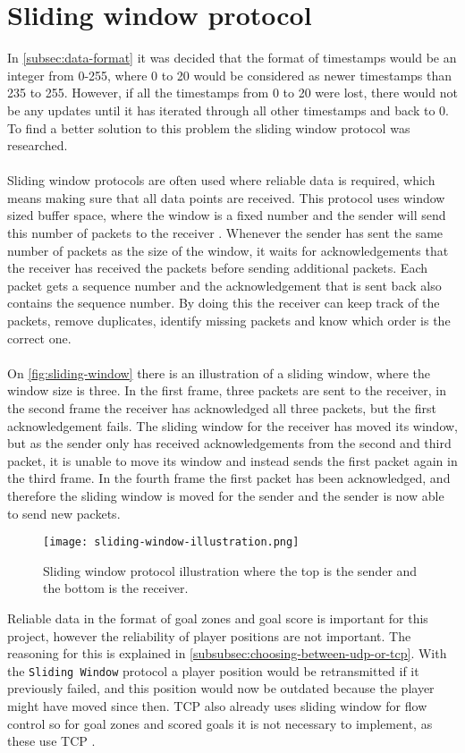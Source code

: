 \section{Sliding window protocol}
In \autoref{subsec:data-format} it was decided that the format of timestamps would be an integer from 0-255, where 0 to 20 would be considered as newer timestamps than 235 to 255.
However, if all the timestamps from 0 to 20 were lost, there would not be any updates until it has iterated through all other timestamps and back to 0.
To find a better solution to this problem the sliding window protocol was researched.
\\\\
Sliding window protocols are often used where reliable data is required, which means making sure that all data points are received.
This protocol uses window sized buffer space, where the window is a fixed number and the sender will send this number of packets to the receiver \cite{design-and-validation-of-computer-protocols}.
Whenever the sender has sent the same number of packets as the size of the window, it waits for acknowledgements that the receiver has received the packets before sending additional packets.
Each packet gets a sequence number and the acknowledgement that is sent back also contains the sequence number.
By doing this the receiver can keep track of the packets, remove duplicates, identify missing packets and know which order is the correct one.
\\\\
On \autoref{fig:sliding-window} there is an illustration of a sliding window, where the window size is three.
In the first frame, three packets are sent to the receiver, in the second frame the receiver has acknowledged all three packets, but the first acknowledgement fails.
The sliding window for the receiver has moved its window, but as the sender only has received acknowledgements from the second and third packet, it is unable to move its window and instead sends the first packet again in the third frame.
In the fourth frame the first packet has been acknowledged, and therefore the sliding window is moved for the sender and the sender is now able to send new packets.
\begin{figure}[H]
    \centering
    \texttt{[image: sliding-window-illustration.png]}
    \caption{Sliding window protocol illustration where the top is the sender and the bottom is the receiver.}
    \label{fig:sliding-window}
\end{figure}
\noindent
Reliable data in the format of goal zones and goal score is important for this project, however the reliability of player positions are not important.
The reasoning for this is explained in \autoref{subsubsec:choosing-between-udp-or-tcp}.
With the \texttt{Sliding Window} protocol a player position would be retransmitted if it previously failed, and this position would now be outdated because the player might have moved since then.
TCP also already uses sliding window for flow control so for goal zones and scored goals it is not necessary to implement, as these use TCP \cite{ibm:sliding-window}.

